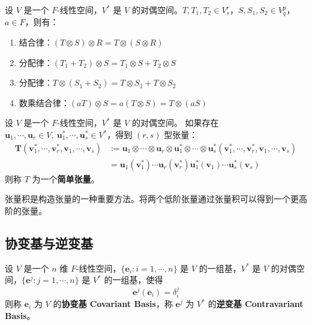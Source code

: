 \begin{proposition}[张量积的性质]
    设 $V$ 是一个 $F$-线性空间，$V^*$ 是 $V$ 的对偶空间。$T,T_1,T_2 \in V^r_s$，$S,S_1,S_2 \in V^p_q$，$a\in F$，则有：
    \begin{enumerate}
        \item 结合律：$(T \otimes S) \otimes R = T \otimes (S \otimes R)$
        \item 分配律：$(T_1 + T_2) \otimes S = T_1 \otimes S + T_2 \otimes S$
        \item 分配律：$T \otimes (S_1 + S_2) = T \otimes S_1 + T \otimes S_2$
        \item 数乘结合律：$(aT) \otimes S = a(T \otimes S) = T \otimes (aS)$
    \end{enumerate}
\end{proposition}

\begin{definition}
    设 $V$ 是一个 $F$-线性空间，$V^*$ 是 $V$ 的对偶空间。
    如果存在 $\mathbf{u}_1,\cdots,\mathbf{u}_r\in V,\ \mathbf{u}_1^*,\cdots,\mathbf{u}_s^*\in V^*$，得到 $(r,s)$ 型张量：
    \begin{align*}
        \mathbf{T}(\mathbf{v}_1^*,\cdots,\mathbf{v}_r^*,\mathbf{v}_1,\cdots,\mathbf{v}_s) &:= \mathbf{u}_1\otimes \cdots \otimes\mathbf{u}_r \otimes \mathbf{u}_1^*\otimes \cdots \otimes\mathbf{u}_s^* (\mathbf{v}_1^*,\cdots,\mathbf{v}_r^*,\mathbf{v}_1,\cdots,\mathbf{v}_s)\\
        &=\mathbf{u}_1(\mathbf{v}_1^*)\cdots\mathbf{u}_r(\mathbf{v}_r^*)\mathbf{u}_1^*(\mathbf{v}_1)\cdots\mathbf{u}_s^*(\mathbf{v}_s)
    \end{align*}
    则称 $T$ 为一个\textbf{简单张量}。
\end{definition}

\begin{note}
    张量积是构造张量的一种重要方法。将两个低阶张量通过张量积可以得到一个更高阶的张量。
\end{note}

\vspace{1em}

\subsection{协变基与逆变基}
\begin{definition}
    设 $V$ 是一个 $n$ 维 $F$-线性空间，$\{\mathbf{e}_i:i=1,\cdots,n\}$ 是 $V$ 的一组基，$V^*$ 是 $V$ 的对偶空间，$\{\mathbf{e}^j:j=1,\cdots,n\}$ 是 $V^*$ 的一组基，使得 
    \[
        \mathbf{e}^j(\mathbf{e}_i) = \delta_i^j
    \]
    则称 $\mathbf{e}_i$ 为 $V$ 的\textbf{协变基 Covariant Basis}，称 $\mathbf{e}^j$ 为 $V^*$ 的\textbf{逆变基 Contravariant Basis}。
    \label{def:covariant_contravariant_basis}
\end{definition}

